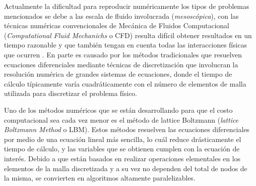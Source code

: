 
%
%

Actualmente la dificultad para reproducir numéricamente los tipos de problemas mencionados se debe a las escala de fluido involucrada (\textit{mesoscópica}), con las técnicas numéricas convencionales de Mecánica de Fluidos Computacional (\textit{Computational Fluid Mechanichs} o CFD) resulta difícil obtener resultados en un tiempo razonable y que también tengan en cuenta todas las interacciones físicas que ocurren \cite{guo2013lattice}. En parte es causado por los métodos tradicionales que resuelven ecuaciones diferenciales mediante técnicas de discretización que involucran la resolución numérica de grandes sistemas de ecuaciones, donde el tiempo de cálculo típicamente varía cuadráticamente con el número de elementos de malla utilizada para discretizar el problema físico.

Uno de los métodos numéricos que se están desarrollando para que el costo computacional sea cada vez menor es el método de lattice Boltzmann (\textit{lattice Boltzmann 
Method} o LBM). Estos métodos resuelven las ecuaciones diferenciales por medio de una ecuación lineal más sencilla, lo cuál reduce drásticamente el tiempo de cálculo, y las variables que se obtienen cumplen con la ecuación de interés. Debido a que están basados en realizar operaciones elementales en los elementos de la malla discretizada y a su vez no dependen del total de nodos de la misma, se convierten en algoritmos altamente paralelizables.

